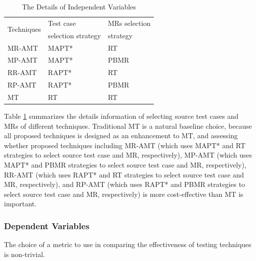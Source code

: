 \documentclass[10pt,journal,compsoc]{IEEEtran}
\begin{document}
\begin{table}
	\caption{The Details of Independent Variables}
	\centering
	\label{table:independent}
	\begin{tabular}{lll} \toprule
	\multirow{2}{*}{Techniques}                        &Test case             &MRs selection  \\
	                                                   &selection strategy    &strategy \\ \midrule
	MR-AMT                                             &MAPT*                 &RT  \\ \cmidrule(lr){2-3}
	MP-AMT                                             &MAPT*                 &PBMR \\ \midrule
	RR-AMT                                             &RAPT*                 &RT \\ \cmidrule(lr){2-3}
	RP-AMT                                             &RAPT*                 &PBMR \\ \midrule
	MT                                                 &RT                    &RT \\ \bottomrule
	\end{tabular}
\end{table}


Table \ref{table:independent} summarizes the details information of selecting source test cases and MRs of different techniques. Traditional MT is a natural baseline choice, because all proposed techniques is designed as an enhancement to MT, and assessing whether proposed techniques including MR-AMT (which uses MAPT* and RT strategies to select source test case and MR, respectively), MP-AMT (which uses MAPT* and PBMR strategies to select source test case and MR, respectively), RR-AMT (which uses RAPT* and RT strategies to select source test case and MR, respectively), and RP-AMT (which uses RAPT* and PBMR strategies to select source test case and MR, respectively) is more cost-effective than MT is important.

\subsubsection{Dependent Variables}
\label{sec:dependentvariables}

The choice of a metric to use in comparing the effectiveness of testing techniques is non-trivial.
\end{document}
